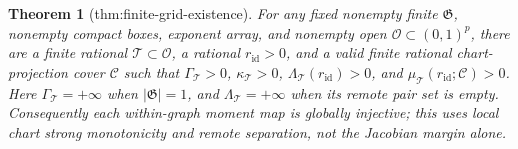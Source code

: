 \documentclass{article}
\newtheorem{theorem}{Theorem}
\begin{document}
\begin{theorem}[thm:finite-grid-existence]\label{thm:finite-grid-existence}
For any fixed nonempty finite \(\mathfrak G\), nonempty compact boxes, exponent array, and nonempty open \(\mathcal O\subset(0,1)^p\), there are a finite rational \(\mathcal T\subset\mathcal O\), a rational \(r_{\mathrm{id}}>0\), and a valid finite rational chart-projection cover \(\mathscr C\) such that \(\Gamma_{\mathcal T}>0\), \(\kappa_{\mathcal T}>0\), \(\Lambda_{\mathcal T}(r_{\mathrm{id}})>0\), and \(\mu_{\mathcal T}(r_{\mathrm{id}};\mathscr C)>0\). Here \(\Gamma_{\mathcal T}=+\infty\) when \(|\mathfrak G|=1\), and \(\Lambda_{\mathcal T}=+\infty\) when its remote pair set is empty. Consequently each within-graph moment map is globally injective; this uses local chart strong monotonicity and remote separation, not the Jacobian margin alone.
\end{theorem}
\end{document}

